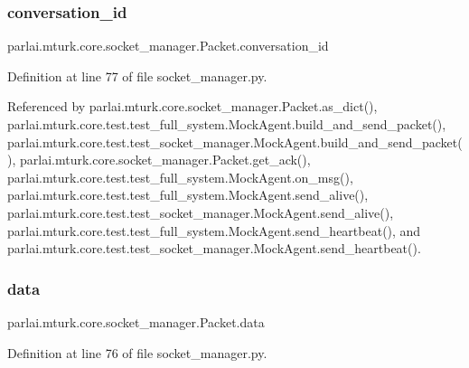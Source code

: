 \subsubsection{\texorpdfstring{conversation\+\_\+id}{conversation\_id}}
{\footnotesize\ttfamily parlai.\+mturk.\+core.\+socket\+\_\+manager.\+Packet.\+conversation\+\_\+id}



Definition at line 77 of file socket\+\_\+manager.\+py.



Referenced by parlai.\+mturk.\+core.\+socket\+\_\+manager.\+Packet.\+as\+\_\+dict(), parlai.\+mturk.\+core.\+test.\+test\+\_\+full\+\_\+system.\+Mock\+Agent.\+build\+\_\+and\+\_\+send\+\_\+packet(), parlai.\+mturk.\+core.\+test.\+test\+\_\+socket\+\_\+manager.\+Mock\+Agent.\+build\+\_\+and\+\_\+send\+\_\+packet(), parlai.\+mturk.\+core.\+socket\+\_\+manager.\+Packet.\+get\+\_\+ack(), parlai.\+mturk.\+core.\+test.\+test\+\_\+full\+\_\+system.\+Mock\+Agent.\+on\+\_\+msg(), parlai.\+mturk.\+core.\+test.\+test\+\_\+full\+\_\+system.\+Mock\+Agent.\+send\+\_\+alive(), parlai.\+mturk.\+core.\+test.\+test\+\_\+socket\+\_\+manager.\+Mock\+Agent.\+send\+\_\+alive(), parlai.\+mturk.\+core.\+test.\+test\+\_\+full\+\_\+system.\+Mock\+Agent.\+send\+\_\+heartbeat(), and parlai.\+mturk.\+core.\+test.\+test\+\_\+socket\+\_\+manager.\+Mock\+Agent.\+send\+\_\+heartbeat().

\mbox{\label{classparlai_1_1mturk_1_1core_1_1socket__manager_1_1Packet_a0da381513a2cef8db0a5cac7825aa8f4}} 
\subsubsection{\texorpdfstring{data}{data}}
{\footnotesize\ttfamily parlai.\+mturk.\+core.\+socket\+\_\+manager.\+Packet.\+data}



Definition at line 76 of file socket\+\_\+manager.\+py.



